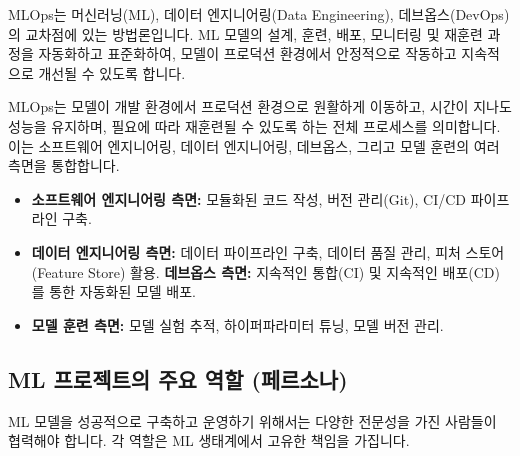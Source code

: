 \documentclass[11pt,a4paper]{article}
\theoremstyle{definition}
\begin{document}
\begin{summarybox}
MLOps는 머신러닝(ML), 데이터 엔지니어링(Data Engineering), 데브옵스(DevOps)의 교차점에 있는 방법론입니다. ML 모델의 설계, 훈련, 배포, 모니터링 및 재훈련 과정을 자동화하고 표준화하여, 모델이 프로덕션 환경에서 안정적으로 작동하고 지속적으로 개선될 수 있도록 합니다.
\end{summarybox}

MLOps는 모델이 개발 환경에서 프로덕션 환경으로 원활하게 이동하고, 시간이 지나도 성능을 유지하며, 필요에 따라 재훈련될 수 있도록 하는 전체 프로세스를 의미합니다. 이는 소프트웨어 엔지니어링, 데이터 엔지니어링, 데브옵스, 그리고 모델 훈련의 여러 측면을 통합합니다.

\begin{itemize}
    \item \textbf{소프트웨어 엔지니어링 측면:} 모듈화된 코드 작성, 버전 관리(Git), CI/CD 파이프라인 구축.
    \item \textbf{데이터 엔지니어링 측면:} 데이터 파이프라인 구축, 데이터 품질 관리, 피처 스토어(Feature Store) 활용.
    \textbf{데브옵스 측면:} 지속적인 통합(CI) 및 지속적인 배포(CD)를 통한 자동화된 모델 배포.
    \item \textbf{모델 훈련 측면:} 모델 실험 추적, 하이퍼파라미터 튜닝, 모델 버전 관리.
\end{itemize}

\subsection{ML 프로젝트의 주요 역할 (페르소나)}

ML 모델을 성공적으로 구축하고 운영하기 위해서는 다양한 전문성을 가진 사람들이 협력해야 합니다. 각 역할은 ML 생태계에서 고유한 책임을 가집니다.
\end{document}
